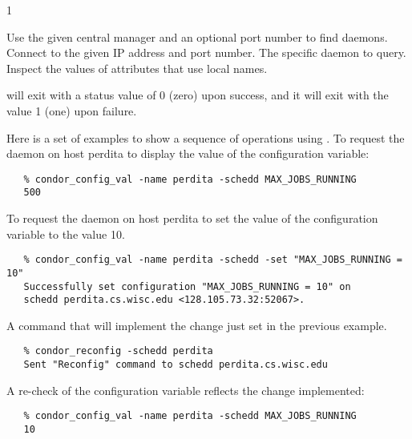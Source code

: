 \begin{ManPage}{\label{man-condor-config-val}}{1}
\begin{Options}
    { Use the given central manager and an optional port number
    to find daemons. }
    { Connect to the given IP address and port number. }
    {The specific daemon to query. }
    {Inspect the values of attributes that use local names.}
\end{Options}

\ExitStatus

 will exit with a status value of 0 (zero) upon success,
and it will exit with the value 1 (one) upon failure.

\Examples

Here is a set of examples to show a sequence of operations using 
.
To request the  daemon on host perdita
to display the value of the  configuration variable:
\footnotesize
\begin{verbatim}
   % condor_config_val -name perdita -schedd MAX_JOBS_RUNNING
   500
\end{verbatim}
\normalsize

To request the  daemon on host perdita
to set the value of the  configuration variable
to the value 10.
\footnotesize
\begin{verbatim}
   % condor_config_val -name perdita -schedd -set "MAX_JOBS_RUNNING = 10"
   Successfully set configuration "MAX_JOBS_RUNNING = 10" on 
   schedd perdita.cs.wisc.edu <128.105.73.32:52067>.
\end{verbatim}
\normalsize

A command that will implement the change just set in the previous
example.
\footnotesize
\begin{verbatim}
   % condor_reconfig -schedd perdita
   Sent "Reconfig" command to schedd perdita.cs.wisc.edu
\end{verbatim}
\normalsize

A re-check of the configuration variable reflects the change implemented:
\footnotesize
\begin{verbatim}
   % condor_config_val -name perdita -schedd MAX_JOBS_RUNNING
   10
\end{verbatim}
\normalsize


\end{ManPage}
